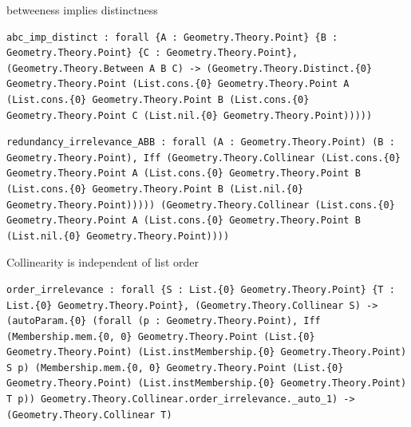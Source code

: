 \begin{theorem}
  \label{Geometry.Theory.Betweenness.abc_imp_distinct}
  \leanok
  betweeness implies distinctness 
\begin{verbatim}abc_imp_distinct : forall {A : Geometry.Theory.Point} {B : Geometry.Theory.Point} {C : Geometry.Theory.Point}, (Geometry.Theory.Between A B C) -> (Geometry.Theory.Distinct.{0} Geometry.Theory.Point (List.cons.{0} Geometry.Theory.Point A (List.cons.{0} Geometry.Theory.Point B (List.cons.{0} Geometry.Theory.Point C (List.nil.{0} Geometry.Theory.Point)))))\end{verbatim}
\end{theorem}


\begin{theorem}
  \label{Geometry.Theory.Collinear.redundancy_irrelevance_ABB}
  \leanok
\begin{verbatim}redundancy_irrelevance_ABB : forall (A : Geometry.Theory.Point) (B : Geometry.Theory.Point), Iff (Geometry.Theory.Collinear (List.cons.{0} Geometry.Theory.Point A (List.cons.{0} Geometry.Theory.Point B (List.cons.{0} Geometry.Theory.Point B (List.nil.{0} Geometry.Theory.Point))))) (Geometry.Theory.Collinear (List.cons.{0} Geometry.Theory.Point A (List.cons.{0} Geometry.Theory.Point B (List.nil.{0} Geometry.Theory.Point))))\end{verbatim}
\end{theorem}

\begin{theorem}
  \label{Geometry.Theory.Collinear.order_irrelevance}
  \leanok
  Collinearity is independent of list order 
\begin{verbatim}order_irrelevance : forall {S : List.{0} Geometry.Theory.Point} {T : List.{0} Geometry.Theory.Point}, (Geometry.Theory.Collinear S) -> (autoParam.{0} (forall (p : Geometry.Theory.Point), Iff (Membership.mem.{0, 0} Geometry.Theory.Point (List.{0} Geometry.Theory.Point) (List.instMembership.{0} Geometry.Theory.Point) S p) (Membership.mem.{0, 0} Geometry.Theory.Point (List.{0} Geometry.Theory.Point) (List.instMembership.{0} Geometry.Theory.Point) T p)) Geometry.Theory.Collinear.order_irrelevance._auto_1) -> (Geometry.Theory.Collinear T)\end{verbatim}
\end{theorem}

